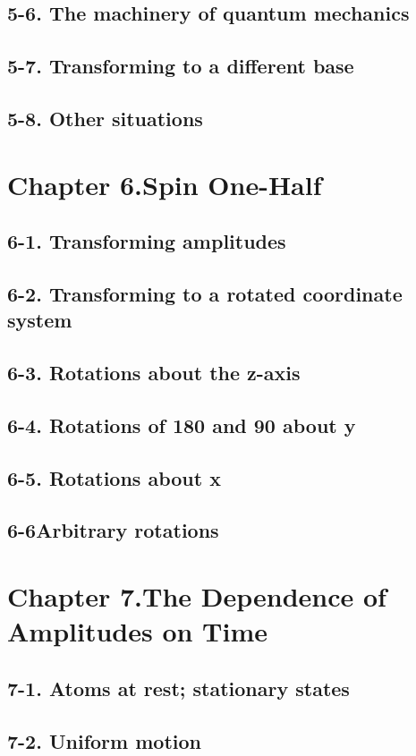 \documentclass{article}
\begin{document}
\subsection{5-6. The machinery of quantum mechanics}
\subsection{5-7. Transforming to a different base}
\subsection{5-8. Other situations}
\section{Chapter 6.Spin One-Half}
\subsection{6-1. Transforming amplitudes}
\subsection{6-2. Transforming to a rotated coordinate system}
\subsection{6-3. Rotations about the z-axis}
\subsection{6-4. Rotations of 180 and 90 about y}
\subsection{6-5. Rotations about x}
\subsection{6-6Arbitrary rotations}
\section{Chapter 7.The Dependence of Amplitudes on Time}
\subsection{7-1. Atoms at rest; stationary states}
\subsection{7-2. Uniform motion}
\end{document}
